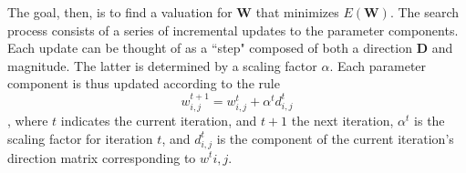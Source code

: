
The goal, then, is to find a valuation for $\mathbf{W}$ that minimizes  $E(\mathbf{W})$. 
The search process consists of a series of incremental updates to the parameter components. Each update can be thought of as a ``step" composed of both a direction $\textbf{D}$ and magnitude. The latter is determined by a scaling factor $\alpha$.
Each parameter component is thus updated according to the rule
\begin{equation}\label{eq:gen-update}
w^{t+1}_{i,j} = w^{t}_{i,j} + \alpha^{t}d^{t}_{i,j}
\end{equation},
where $t$ indicates the current iteration, and $t+1$ the next iteration, $\alpha^{t}$ is the scaling factor for iteration $t$,  and $d^{t}_{i,j}$ is the component of the current iteration's direction matrix corresponding to $w^{t}{i,j}$. 

